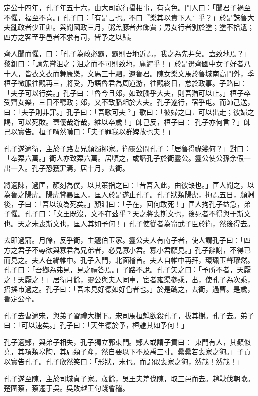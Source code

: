 \begin{pinyinscope}
定公十四年，孔子年五十六，由大司寇行攝相事，有喜色。門人曰：「聞君子禍至不懼，福至不喜。」孔子曰：「有是言也。不曰『樂其以貴下人』乎？」於是誅魯大夫亂政者少正卯。與聞國政三月，粥羔豚者弗飾賈；男女行者別於塗；塗不拾遺；四方之客至乎邑者不求有司，皆予之以歸。

齊人聞而懼，曰：「孔子為政必霸，霸則吾地近焉，我之為先并矣。盍致地焉？」黎鉏曰：「請先嘗沮之；沮之而不可則致地，庸遲乎！」於是選齊國中女子好者八十人，皆衣文衣而舞康樂，文馬三十駟，遺魯君。陳女樂文馬於魯城南高門外，季桓子微服往觀再三，將受，乃語魯君為周道游，往觀終日，怠於政事。子路曰：「夫子可以行矣。」孔子曰：「魯今且郊，如致膰乎大夫，則吾猶可以止。」桓子卒受齊女樂，三日不聽政；郊，又不致膰俎於大夫。孔子遂行，宿乎屯。而師己送，曰：「夫子則非罪。」孔子曰：「吾歌可夫？」歌曰：「彼婦之口，可以出走；彼婦之謁，可以死敗。蓋優哉游哉，維以卒歲！」師己反，桓子曰：「孔子亦何言？」師己以實告。桓子喟然嘆曰：「夫子罪我以群婢故也夫！」

孔子遂適衛，主於子路妻兄顏濁鄒家。衛靈公問孔子：「居魯得祿幾何？」對曰：「奉粟六萬。」衛人亦致粟六萬。居頃之，或譖孔子於衛靈公。靈公使公孫余假一出一入。孔子恐獲罪焉，居十月，去衛。

將適陳，過匡，顏刻為僕，以其策指之曰：「昔吾入此，由彼缺也。」匡人聞之，以為魯之陽虎。陽虎嘗暴匡人，匡人於是遂止孔子。孔子狀類陽虎，拘焉五日，顏淵後，子曰：「吾以汝為死矣。」顏淵曰：「子在，回何敢死！」匡人拘孔子益急，弟子懼。孔子曰：「文王既沒，文不在茲乎？天之將喪斯文也，後死者不得與于斯文也。天之未喪斯文也，匡人其如予何！」孔子使從者為甯武子臣於衛，然後得去。

去即過蒲。月餘，反乎衛，主蘧伯玉家。靈公夫人有南子者，使人謂孔子曰：「四方之君子不辱欲與寡君為兄弟者，必見寡小君。寡小君願見。」孔子辭謝，不得已而見之。夫人在絺帷中。孔子入門，北面稽首。夫人自帷中再拜，環珮玉聲璆然。孔子曰：「吾鄉為弗見，見之禮答焉。」子路不說。孔子矢之曰：「予所不者，天厭之！天厭之！」居衛月餘，靈公與夫人同車，宦者雍渠參乘，出，使孔子為次乘，招搖市過之。孔子曰：「吾未見好德如好色者也。」於是醜之，去衛，過曹。是歲，魯定公卒。

孔子去曹適宋，與弟子習禮大樹下。宋司馬桓魋欲殺孔子，拔其樹。孔子去。弟子曰：「可以速矣。」孔子曰：「天生德於予，桓魋其如予何！」

孔子適鄭，與弟子相失，孔子獨立郭東門。鄭人或謂子貢曰：「東門有人，其顙似堯，其項類皋陶，其肩類子產，然自要以下不及禹三寸。纍纍若喪家之狗。」子貢以實告孔子。孔子欣然笑曰：「形狀，末也。而謂似喪家之狗，然哉！然哉！」

孔子遂至陳，主於司城貞子家。歲餘，吳王夫差伐陳，取三邑而去。趙鞅伐朝歌。楚圍蔡，蔡遷于吳。吳敗越王句踐會稽。


\end{pinyinscope}

